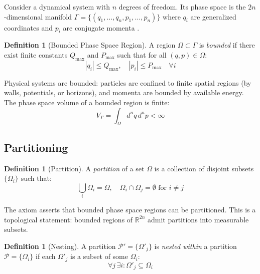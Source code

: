 \documentclass[twocolumn,10pt,a4paper]{article}
\theoremstyle{definition}
\newtheorem{definition}[theorem]{Definition}
\theoremstyle{remark}
\newcommand{\Partition}{\mathcal{P}}
\begin{document}
Consider a dynamical system with $n$ degrees of freedom. Its phase space is the $2n$-dimensional manifold $\Gamma = \{(q_1, \ldots, q_n, p_1, \ldots, p_n)\}$ where $q_i$ are generalized coordinates and $p_i$ are conjugate momenta \cite{arnold1989}.

\begin{definition}[Bounded Phase Space Region]
A region $\Omega \subset \Gamma$ is \emph{bounded} if there exist finite constants $Q_{\max}$ and $P_{\max}$ such that for all $(q, p) \in \Omega$:
\begin{equation}
    |q_i| \leq Q_{\max}, \quad |p_i| \leq P_{\max} \quad \forall i
\end{equation}
\end{definition}

Physical systems are bounded: particles are confined to finite spatial regions (by walls, potentials, or horizons), and momenta are bounded by available energy. The phase space volume of a bounded region is finite:
\begin{equation}
    V_\Gamma = \int_\Omega d^n q \, d^n p < \infty
\end{equation}

\subsection{Partitioning}

\begin{definition}[Partition]
A \emph{partition} of a set $\Omega$ is a collection of disjoint subsets $\{\Omega_i\}$ such that:
\begin{equation}
    \bigcup_i \Omega_i = \Omega, \quad \Omega_i \cap \Omega_j = \emptyset \text{ for } i \neq j
\end{equation}
\end{definition}

The axiom asserts that bounded phase space regions can be partitioned. This is a topological statement: bounded regions of $\mathbb{R}^{2n}$ admit partitions into measurable subsets.

\begin{definition}[Nesting]
A partition $\Partition' = \{\Omega'_j\}$ is \emph{nested within} a partition $\Partition = \{\Omega_i\}$ if each $\Omega'_j$ is a subset of some $\Omega_i$:
\begin{equation}
    \forall j \, \exists i : \Omega'_j \subseteq \Omega_i
\end{equation}
\end{definition}
\end{document}
